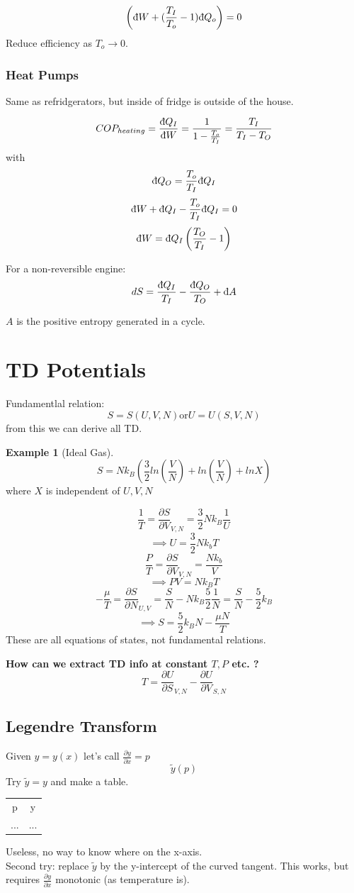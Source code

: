 \documentclass[11pt]{article}
\theoremstyle{definition}
\newtheorem{exm}{Example}[section]
\begin{document}
\[ \left( \text{\dj}W + (\frac{T_I}{T_o} - 1) \text{\dj}Q_o \right)  = 0\] 
Reduce efficiency as $T_o \to 0$.

\subsubsection{Heat Pumps}%
\label{ssub:Heat Pumps}
Same as refridgerators, but inside of fridge is outside of the house.

\[ COP_{heating} = \frac{ \text{\dj}Q_I }{ \text{\dj}W } = \frac{1}{1-\frac{T_o}{T_I}} = \frac{T_I}{T_I-T_O} \] 
with \[ \text{\dj}Q_O = \frac{T_o}{T_I} \text{\dj}Q_I \] 
\[ \text{\dj}W + \text{\dj} Q_I - \frac{T_o}{T_I} \text{\dj}Q_I = 0 \] 
\[ \text{\dj}W = \text{\dj}Q_I \left( \frac{T_O}{T_I} - 1 \right)  \] 

For a non-reversible engine:
\[ dS =\frac{ \text{\dj}Q_I}{T_I} - \frac{ \text{\dj}Q_O}{T_O} + \text{\dj}A \] 

$ A $ is the positive entropy generated in a cycle.

\section{TD Potentials}
Fundamentlal relation:
\[ S=S(U,V,N) \text{or} U=U(S,V,N) \] 
from this we can derive all TD.

\begin{exm}[Ideal Gas]
	\[ S = Nk_B\left( \frac{3}{2}ln(\frac{V}{N}) + ln (\frac{V}{N}) + ln X \right)  \] 
	where $ X $ is independent of $ U,V,N $ 
	
	\[ \frac{1}{T} = \frac{\partial S}{\partial V}_{V,N} = \frac{3}{2}Nk_B \frac{1}{U} \] 
	\[ \implies U = \frac{3}{2}Nk_bT \] 
	\[ \frac{P}{T} = \frac{\partial S}{\partial V}_{V,N} = \frac{Nk_b}{V} \] 
	\[ \implies PV = Nk_BT \] 
	\[ -\frac{\mu}{T} = \frac{\partial S}{\partial N}_{U,V} = \frac{S}{N} - Nk_B \frac{5}{2}\frac{1}{N} = \frac{S}{N}-\frac{5}{2}k_B\] 
	\[ \implies S = \frac{5}{2}k_BN - \frac{\mu N}{T} \] 
	These are all equations of states, not fundamental relations.
\end{exm}
	
\textbf{How can we extract TD info at constant $ T,P $ etc. ?} 
\[ T = \frac{\partial U}{\partial S}_{V,N} - \frac{\partial U}{\partial V}_{S,N}\] 

\subsection{Legendre Transform}
Given $ y = y(x) $ let's call $ \frac{\partial y}{\partial x} = p $ 
\[ \tilde y(p) \] 
Try $ \tilde y = y $ and make a table. \\
\begin{table}[htpb]
	\centering
	\begin{tabular}{c c}
		p & y \\
		... & ...
	\end{tabular}
\end{table}
Useless, no way to know where on the x-axis.\\
Second try: replace $ \tilde y $ by the y-intercept of the curved tangent.
This works, but requires $ \frac{\partial y}{\partial x} $ monotonic (as temperature is).
\end{document}
